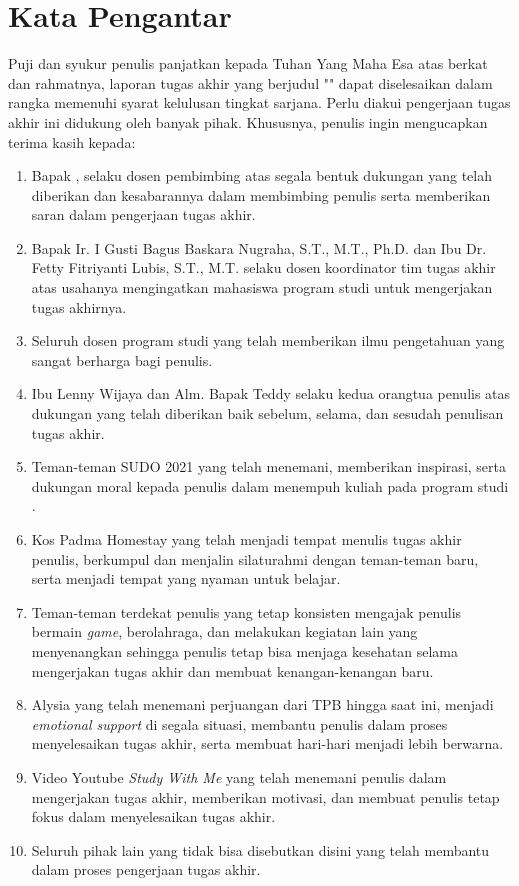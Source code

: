 \chapter*{Kata Pengantar}

Puji dan syukur penulis panjatkan kepada Tuhan Yang Maha Esa atas berkat dan rahmatnya, laporan tugas akhir yang berjudul "\thetitle" dapat diselesaikan dalam rangka memenuhi syarat kelulusan tingkat sarjana. Perlu diakui pengerjaan tugas akhir ini didukung oleh banyak pihak. Khususnya, penulis ingin mengucapkan terima kasih kepada:

\begin{enumerate}
	\item Bapak \namadosbingfull, selaku dosen pembimbing atas segala bentuk dukungan yang telah diberikan dan kesabarannya dalam membimbing penulis serta memberikan saran dalam pengerjaan tugas akhir.
	\item Bapak Ir. I Gusti Bagus Baskara Nugraha, S.T., M.T., Ph.D. dan Ibu Dr. Fetty Fitriyanti Lubis, S.T., M.T.  selaku dosen koordinator tim tugas akhir atas usahanya mengingatkan mahasiswa program studi \stifull{} untuk mengerjakan tugas akhirnya.
	\item Seluruh dosen program studi \stifull{} \itb{} yang telah memberikan ilmu pengetahuan yang sangat berharga bagi penulis.
	\item Ibu Lenny Wijaya dan Alm. Bapak Teddy selaku kedua orangtua penulis atas dukungan yang telah diberikan baik sebelum, selama, dan sesudah penulisan tugas akhir.
	\item Teman-teman SUDO 2021 yang telah menemani, memberikan inspirasi, serta dukungan moral kepada penulis dalam menempuh kuliah pada program studi \stifull.
	\item Kos Padma Homestay yang telah menjadi tempat menulis tugas akhir penulis, berkumpul dan menjalin silaturahmi dengan teman-teman baru, serta menjadi tempat yang nyaman untuk belajar.
	\item Teman-teman terdekat penulis yang tetap konsisten mengajak penulis bermain \textit{game}, berolahraga, dan melakukan kegiatan lain yang menyenangkan sehingga penulis tetap bisa menjaga kesehatan selama mengerjakan tugas akhir dan membuat kenangan-kenangan baru.
	\item Alysia yang telah menemani perjuangan dari TPB hingga saat ini, menjadi \textit{emotional support} di segala situasi, membantu penulis dalam proses menyelesaikan tugas akhir, serta membuat hari-hari menjadi lebih berwarna.
	\item Video Youtube \textit{Study With Me} yang telah menemani penulis dalam mengerjakan tugas akhir, memberikan motivasi, dan membuat penulis tetap fokus dalam menyelesaikan tugas akhir.
	\item Seluruh pihak lain yang tidak bisa disebutkan disini yang telah membantu dalam proses pengerjaan tugas akhir.
\end{enumerate}

